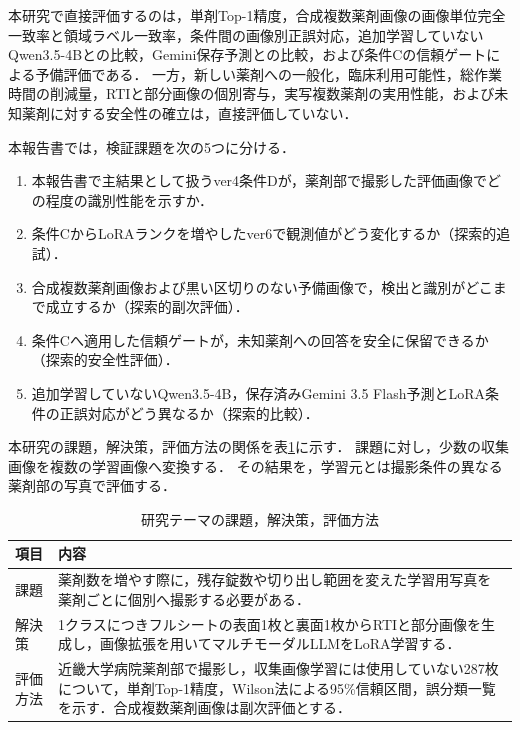\documentclass[uplatex,dvipdfmx]{jsarticle}
\begin{document}
本研究で直接評価するのは，単剤Top-1精度，合成複数薬剤画像の画像単位完全一致率と領域ラベル一致率，条件間の画像別正誤対応，追加学習していないQwen3.5-4Bとの比較，Gemini保存予測との比較，および条件Cの信頼ゲートによる予備評価である．
一方，新しい薬剤への一般化，臨床利用可能性，総作業時間の削減量，RTIと部分画像の個別寄与，実写複数薬剤の実用性能，および未知薬剤に対する安全性の確立は，直接評価していない．

本報告書では，検証課題を次の5つに分ける．
\begin{enumerate}
  \item 本報告書で主結果として扱うver4条件Dが，薬剤部で撮影した評価画像でどの程度の識別性能を示すか．
  \item 条件CからLoRAランクを増やしたver6で観測値がどう変化するか（探索的追試）．
  \item 合成複数薬剤画像および黒い区切りのない予備画像で，検出と識別がどこまで成立するか（探索的副次評価）．
  \item 条件Cへ適用した信頼ゲートが，未知薬剤への回答を安全に保留できるか（探索的安全性評価）．
  \item 追加学習していないQwen3.5-4B，保存済みGemini 3.5 Flash予測とLoRA条件の正誤対応がどう異なるか（探索的比較）．
\end{enumerate}

本研究の課題，解決策，評価方法の関係を表\ref{tab:research_summary}に示す．
課題に対し，少数の収集画像を複数の学習画像へ変換する．
その結果を，学習元とは撮影条件の異なる薬剤部の写真で評価する．

\begin{table}[H]
  \centering
  \caption{研究テーマの課題，解決策，評価方法}
  \label{tab:research_summary}
  \small
  \begin{tabular}{|p{2.0cm}|p{10.5cm}|}
    \hline
    項目 & 内容 \\ \hline
    課題 & 薬剤数を増やす際に，残存錠数や切り出し範囲を変えた学習用写真を薬剤ごとに個別へ撮影する必要がある． \\ \hline
    解決策 & 1クラスにつきフルシートの表面1枚と裏面1枚からRTIと部分画像を生成し，画像拡張を用いてマルチモーダルLLMをLoRA学習する． \\ \hline
    評価方法 & 近畿大学病院薬剤部で撮影し，収集画像学習には使用していない287枚について，単剤Top-1精度，Wilson法による95\%信頼区間，誤分類一覧を示す．合成複数薬剤画像は副次評価とする． \\ \hline
  \end{tabular}
\end{table}
\end{document}
